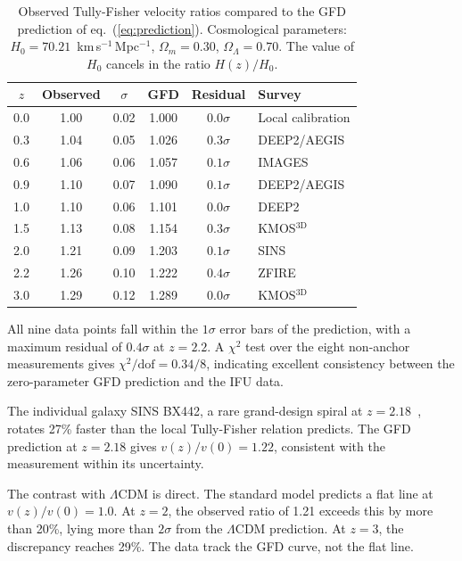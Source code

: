 \documentclass[a4paper,11pt]{article}
\begin{document}
\begin{table}[t]
\centering
\begin{tabular}{@{}cccccl@{}}
\toprule
$z$ & Observed & $\sigma$ & GFD & Residual & Survey \\
\midrule
0.0 & 1.00 & 0.02 & 1.000 & $0.0\sigma$ & Local calibration \\
0.3 & 1.04 & 0.05 & 1.026 & $0.3\sigma$ & DEEP2/AEGIS~\cite{kassin2007} \\
0.6 & 1.06 & 0.06 & 1.057 & $0.1\sigma$ & IMAGES~\cite{puech2008} \\
0.9 & 1.10 & 0.07 & 1.090 & $0.1\sigma$ & DEEP2/AEGIS~\cite{kassin2007} \\
1.0 & 1.10 & 0.06 & 1.101 & $0.0\sigma$ & DEEP2~\cite{miller2011} \\
1.5 & 1.13 & 0.08 & 1.154 & $0.3\sigma$ & KMOS$^{\mathrm{3D}}$~\cite{ubler2017} \\
2.0 & 1.21 & 0.09 & 1.203 & $0.1\sigma$ & SINS~\cite{cresci2009} \\
2.2 & 1.26 & 0.10 & 1.222 & $0.4\sigma$ & ZFIRE~\cite{straatman2017} \\
3.0 & 1.29 & 0.12 & 1.289 & $0.0\sigma$ & KMOS$^{\mathrm{3D}}$~\cite{ubler2017} \\
\bottomrule
\end{tabular}
\caption{Observed Tully-Fisher velocity ratios compared to the GFD prediction of eq.~(\ref{eq:prediction}). Cosmological parameters: $H_0 = 70.21$~km\,s$^{-1}$\,Mpc$^{-1}$, $\Omega_m = 0.30$, $\Omega_\Lambda = 0.70$. The value of $H_0$ cancels in the ratio $H(z)/H_0$.}
\label{tab:tf}
\end{table}

All nine data points fall within the $1\sigma$ error bars of the prediction, with a maximum residual of $0.4\sigma$ at $z = 2.2$. A $\chi^2$ test over the eight non-anchor measurements gives $\chi^2/\mathrm{dof} = 0.34/8$, indicating excellent consistency between the zero-parameter GFD prediction and the IFU data.

The individual galaxy SINS BX442, a rare grand-design spiral at $z = 2.18$~\cite{law2012}, rotates 27\% faster than the local Tully-Fisher relation predicts. The GFD prediction at $z = 2.18$ gives $v(z)/v(0) = 1.22$, consistent with the measurement within its uncertainty.

The contrast with $\Lambda$CDM is direct. The standard model predicts a flat line at $v(z)/v(0) = 1.0$. At $z = 2$, the observed ratio of 1.21 exceeds this by more than 20\%, lying more than $2\sigma$ from the $\Lambda$CDM prediction. At $z = 3$, the discrepancy reaches 29\%. The data track the GFD curve, not the flat line.
\end{document}

